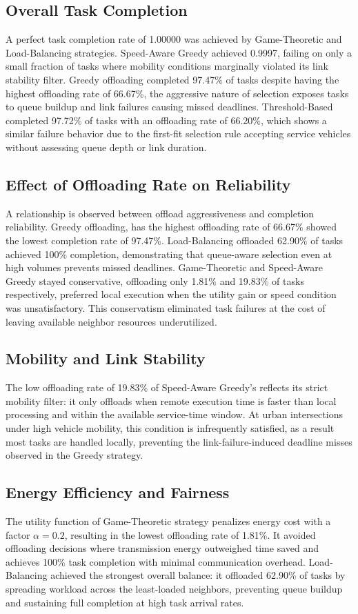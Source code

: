 \documentclass[conference]{IEEEtran}
\begin{document}
\subsection{Overall Task Completion}
A perfect task completion rate of 1.00000 was achieved by Game-Theoretic and Load-Balancing strategies. Speed-Aware Greedy achieved 0.9997, failing on only a small fraction of tasks where mobility conditions marginally violated its link stability filter. Greedy offloading completed 97.47\% of tasks despite having the highest offloading rate of 66.67\%, the aggressive nature of selection exposes tasks to queue buildup and link failures causing missed deadlines. Threshold-Based completed 97.72\% of tasks with an offloading rate of 66.20\%, which shows a similar failure behavior due to the first-fit selection rule accepting service vehicles without assessing queue depth or link duration.
 
\subsection{Effect of Offloading Rate on Reliability}
A relationship is observed between offload aggressiveness and completion reliability. Greedy offloading, has the highest offloading rate of 66.67\% showed the lowest completion rate of 97.47\%. Load-Balancing offloaded 62.90\% of tasks achieved 100\% completion, demonstrating that queue-aware selection even at high volumes prevents missed deadlines. Game-Theoretic and Speed-Aware Greedy stayed conservative, offloading only 1.81\% and 19.83\% of tasks respectively, preferred local execution when the utility gain or speed condition was unsatisfactory. This conservatism eliminated task failures at the cost of leaving available neighbor resources underutilized.
 
\subsection{Mobility and Link Stability}
The low offloading rate of 19.83\% of Speed-Aware Greedy's reflects its strict mobility filter: it only offloads when remote execution time is faster than local processing and within the available service-time window. At urban intersections under high vehicle mobility, this condition is infrequently satisfied, as a result most tasks are handled locally, preventing the link-failure-induced deadline misses observed in the Greedy strategy.
 
\subsection{Energy Efficiency and Fairness}
The utility function of Game-Theoretic strategy penalizes energy cost with a factor $\alpha = 0.2$, resulting in the lowest offloading rate of 1.81\%. It avoided offloading decisions where transmission energy outweighed time saved and achieves 100\% task completion with minimal communication overhead. Load-Balancing achieved the strongest overall balance: it offloaded 62.90\% of tasks by spreading workload across the least-loaded neighbors, preventing queue buildup and sustaining full completion at high task arrival rates.
 
\end{document}
